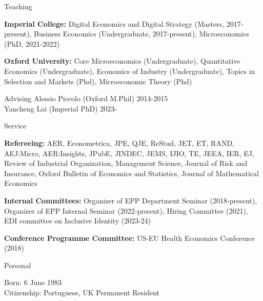 \documentclass{resume}
\begin{document}
\begin{rSection}{Teaching}

\textbf{Imperial College:} Digital Economics and Digital Strategy (Masters, 2017-present), Business Economics (Undergraduate, 2017-present), Microeconomics (PhD, 2021-2022)

\textbf{Oxford University:} Core Microeconomics (Undergraduate), Quantitative Economics (Undergraduate), Economics of Industry (Undergraduate), Topics in Selection and Markets (Phd), Microeconomic Theory (Phd)

\end{rSection}








\begin{rSection}{Advising}
	Alessio Piccolo (Oxford M.Phil) \hfill {2014-2015} \\
	Yancheng Lai (Imperial PhD) \hfill {2023-}		
\end{rSection}




\begin{rSection}{Service}

\textbf{Refereeing:} AER, Econometrica, JPE, QJE, ReStud, JET, ET, RAND, AEJ:Micro, AER:Insights, JPubE, JINDEC, JEMS, IJIO, TE, JEEA, IER, EJ, Review of Industrial Organization, Management Science, Journal of Risk and Insurance, Oxford Bulletin of Economics and Statistics, Journal of Mathematical Economics


\textbf{Internal Committees:} Organizer of EPP Department Seminar (2018-present), Organizer of EPP Internal Seminar  (2022-present),  Hiring Committee (2021), EDI committee on Inclusive Identity (2023-24)

\textbf{Conference Programme Committee:} US-EU Health Economics Conference (2018)
	
\end{rSection}




\begin{rSection}{Personal}

Born: 6 June 1983
\\ Citizenship: Portuguese, UK Permanent Resident

\end{rSection}
\end{document}

